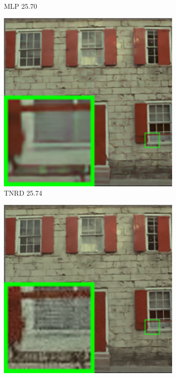 \begin{figure}
\begin{subfigure}[t]{0.19\textwidth}
\caption{MLP 25.70}
    \end{subfigure}
    \hfill
    \begin{subfigure}[t]{0.19\textwidth}
        \centering
        \includegraphics[width=1\textwidth]{images/mcwnnm/24images/resize_br_TNRD_nSig402030_kodim01.png}
\caption{TNRD 25.74}
    \end{subfigure}
    \hfill
    \begin{subfigure}[t]{0.19\textwidth}
        \centering
        \includegraphics[width=1\textwidth]{images/mcwnnm/24images/resize_br_NC_nSig402030_kodim01.png}

\end{subfigure}
\end{figure}
